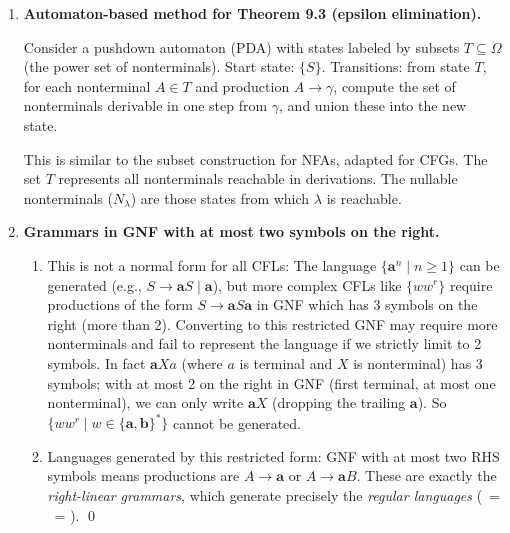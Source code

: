 \begin{enumerate}[{9.}1. ]
\begin{enumerate}
\item For $|\Sigma| > 1$: given the result for $\Sigma = \{\pmb{a},\pmb{b},\pmb{c}\}$ from part (a), define a homomorphism $h: \{\pmb{a},\pmb{b},\pmb{c}\}^* \to \Sigma^*$ (injecting the three-letter alphabet into any alphabet with more than one symbol). By closure of CFLs under inverse homomorphism, the preimage of a CFL under $h$ is a CFL. If $\CSIG$ were closed under complement for $\Sigma$, pulling back via $h$ would show closure for three-letter alphabets, contradicting part (a). \qed
\end{enumerate}

\item \textbf{Automaton-based method for Theorem 9.3 (epsilon elimination).}

Consider a pushdown automaton (PDA) with states labeled by subsets $T \subseteq \Omega$ (the power set of nonterminals). Start state: $\{S\}$. Transitions: from state $T$, for each nonterminal $A \in T$ and production $A \to \gamma$, compute the set of nonterminals derivable in one step from $\gamma$, and union these into the new state.

This is similar to the subset construction for NFAs, adapted for CFGs. The set $T$ represents all nonterminals reachable in derivations. The nullable nonterminals ($N_\lambda$) are those states from which $\lambda$ is reachable.

\item \textbf{Grammars in GNF with at most two symbols on the right.}

\begin{enumerate}
\item This is not a normal form for all CFLs: The language $\{\pmb{a}^n \mid n \geq 1\}$ can be generated (e.g., $S \to \pmb{a}S \mid \pmb{a}$), but more complex CFLs like $\{ww^r\}$ require productions of the form $S \to \pmb{a}S\pmb{a}$ in GNF which has 3 symbols on the right (more than 2). Converting to this restricted GNF may require more nonterminals and fail to represent the language if we strictly limit to 2 symbols. In fact $\pmb{a}Xa$ (where $a$ is terminal and $X$ is nonterminal) has 3 symbols; with at most 2 on the right in GNF (first terminal, at most one nonterminal), we can only write $\pmb{a}X$ (dropping the trailing $\pmb{a}$). So $\{ww^r \mid w \in \{\pmb{a},\pmb{b}\}^*\}$ cannot be generated.

\item Languages generated by this restricted form: GNF with at most two RHS symbols means productions are $A \to \pmb{a}$ or $A \to \pmb{a}B$. These are exactly the \emph{right-linear grammars}, which generate precisely the \emph{regular languages} (\DSIG\ = \GSIG\ = \RSIG). \qed
\end{enumerate}


\end{enumerate}
